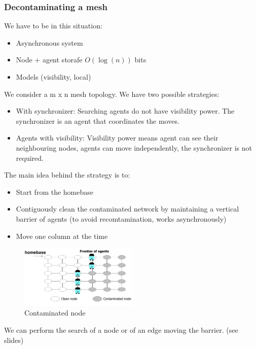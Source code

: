 \documentclass[paper=a4, fontsize=11pt]{scrartcl} %
\numberwithin{equation}{section} %
\numberwithin{figure}{section} %
\numberwithin{table}{section} %
\begin{document}
\subsubsection*{Decontaminating a mesh}
We have to be in this situation: 
\begin{itemize}
\item Asynchronous system
\item Node + agent storafe $O(\log(n))$ bits
\item Models (visibility, local)
\end{itemize}
We consider a m x n mesh topology. We have two possible strategies:
\begin{itemize}
\item With synchronizer: Searching agents do not have visibility power. The synchronizer is an agent that coordinates the moves.
\item Agents with visibility: Visibility power means agent can see their neighbouring nodes, agents can move independently, the synchronizer is not required.
\end{itemize}
The main idea behind the strategy is to: 
\begin{itemize}
\item Start from the homebase
\item Contiguously clean the contaminated network by maintaining a vertical barrier of agents (to avoid recomtamination, works asynchronously)
\item Move one column at the time
\end{itemize}
\begin{figure}[H]
  \centering
  \includegraphics[width=0.5\textwidth]{img/cont_front.png}
  \caption{Contaminated node}
  \label{fig:boat1}
\end{figure}
We can perform the search of a node or of an edge moving the barrier. (see slides)
\end{document}
